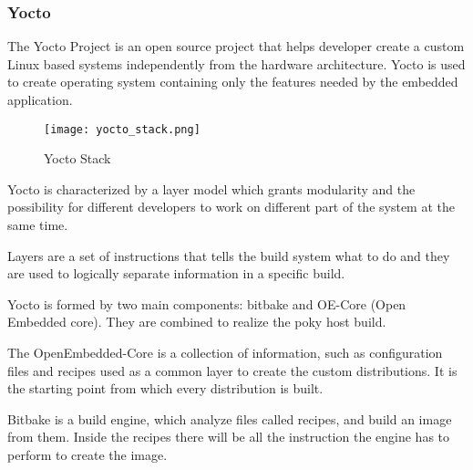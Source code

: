 \subsubsection{Yocto}

The Yocto Project is an open source project that helps developer create a
custom Linux based systems independently from the hardware architecture.
\cite{yocto}
Yocto is used to create operating system containing only the features
needed by the embedded application. 

\begin{figure}[htb]
    \centering
    \texttt{[image: yocto\_stack.png]}
    \caption{Yocto Stack}
    \label{fig:yocto_stack}
\end{figure}

Yocto is characterized by a layer model which grants modularity and the
possibility for different developers to work on different part of the system
at the same time.

Layers are a set of instructions that tells the build system what to do
and they are used to logically separate information in a specific build.

Yocto is formed by two main components: bitbake and OE-Core (Open Embedded core).
They are combined to realize the poky host build.

The OpenEmbedded-Core is a collection of information, such as configuration
files and recipes used as a common layer to create the custom distributions.
It is the starting point from which every distribution is built.

Bitbake is a build engine, which analyze files called recipes, and build an
image from them. Inside the recipes there will be all the instruction the
engine has to perform to create the image.


